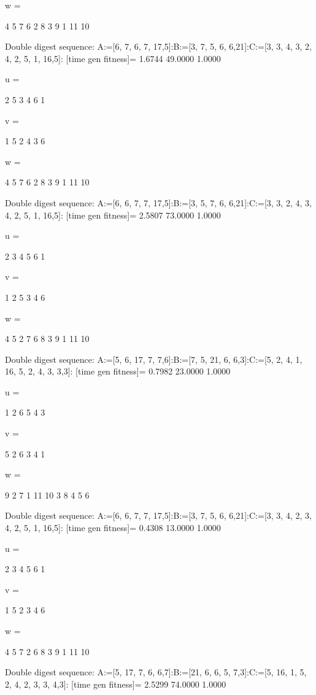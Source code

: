 w =

     4     5     7     6     2     8     3     9     1    11    10

Double digest sequence:
A:=[6, 7, 6, 7, 17,5]:B:=[3, 7, 5, 6, 6,21]:C:=[3, 3, 4, 3, 2, 4, 2, 5, 1, 16,5]:
[time gen fitness]=
    1.6744   49.0000    1.0000


u =

     2     5     3     4     6     1


v =

     1     5     2     4     3     6


w =

     4     5     7     6     2     8     3     9     1    11    10

Double digest sequence:
A:=[6, 6, 7, 7, 17,5]:B:=[3, 5, 7, 6, 6,21]:C:=[3, 3, 2, 4, 3, 4, 2, 5, 1, 16,5]:
[time gen fitness]=
    2.5807   73.0000    1.0000


u =

     2     3     4     5     6     1


v =

     1     2     5     3     4     6


w =

     4     5     2     7     6     8     3     9     1    11    10

Double digest sequence:
A:=[5, 6, 17, 7, 7,6]:B:=[7, 5, 21, 6, 6,3]:C:=[5, 2, 4, 1, 16, 5, 2, 4, 3, 3,3]:
[time gen fitness]=
    0.7982   23.0000    1.0000


u =

     1     2     6     5     4     3


v =

     5     2     6     3     4     1


w =

     9     2     7     1    11    10     3     8     4     5     6

Double digest sequence:
A:=[6, 6, 7, 7, 17,5]:B:=[3, 7, 5, 6, 6,21]:C:=[3, 3, 4, 2, 3, 4, 2, 5, 1, 16,5]:
[time gen fitness]=
    0.4308   13.0000    1.0000


u =

     2     3     4     5     6     1


v =

     1     5     2     3     4     6


w =

     4     5     7     2     6     8     3     9     1    11    10

Double digest sequence:
A:=[5, 17, 7, 6, 6,7]:B:=[21, 6, 6, 5, 7,3]:C:=[5, 16, 1, 5, 2, 4, 2, 3, 3, 4,3]:
[time gen fitness]=
    2.5299   74.0000    1.0000


